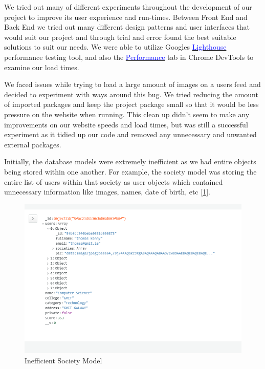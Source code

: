 We tried out many of different experiments throughout the development of our project to improve its user experience and run-times. Between Front End and Back End we tried out many different design patterns and user interfaces that would suit our project and through trial and error found the best suitable solutions to suit our needs. We were able to utilize Googles \href{https://developers.google.com/web/tools/lighthouse/}{\textcolor{blue}{Lighthouse}} performance testing tool, and also the \href{https://developer.chrome.com/docs/devtools/evaluate-performance/}{\textcolor{blue}{Performance}} tab in Chrome DevTools to examine our load times.
\newline

We faced issues while trying to load a large amount of images on a users feed and decided to experiment with ways around this bug. We tried reducing the amount of imported packages and keep the project package small so that it would be less pressure on the website when running. This clean up didn't seem to make any improvements on our website speeds and load times, but was still a successful experiment as it tidied up our code and removed any unnecessary and unwanted external packages.
\newline

Initially, the database models were extremely inefficient as we had entire objects being stored within one another. For example, the society model was storing the entire list of users within that society as user objects which contained unnecessary information like images, names, date of birth, etc [\ref{fig:inefficient_society_model}].

\begin{figure}[H]
    \centering
    \includegraphics[scale=0.8]{img/bad_society_model_1.jpg}
    \caption{Inefficient Society Model}
    \label{fig:inefficient_society_model}
\end{figure}

